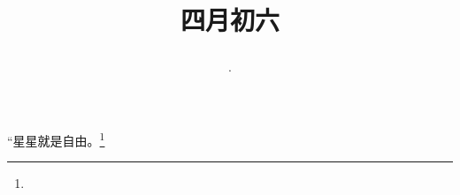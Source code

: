 \title{\date[d=13,m=5,y=2024][year:cn-y,年,month:cn,day:cn,日,·,weekday]·四月初六 }
“星星就是自由。\footnote{ }

